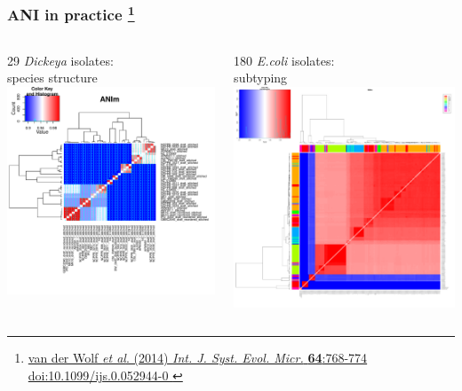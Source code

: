 \begin{frame}
  \frametitle{ANI in practice
    \footnote{\tiny{\href{http://dx.doi.org/10.1099/ijs.0.052944-0}{van der Wolf \textit{et al}. (2014) \textit{Int. J. Syst. Evol. Micr.} \textbf{64}:768-774 doi:10.1099/ijs.0.052944-0
    }}}
    }
  \begin{columns}[T]
    \begin{column}{5cm}
    29 \textit{Dickeya} isolates:\\
    species structure\\
      \includegraphics[width=\textwidth]{images/ANIm_Dickeya}
    \end{column}
    \begin{column}{5cm}
    180 \textit{E.coli} isolates:\\
    subtyping
      \includegraphics[width=\textwidth]{images/ANIm_Ecoli}

\end{column}
\end{columns}
\end{frame}
